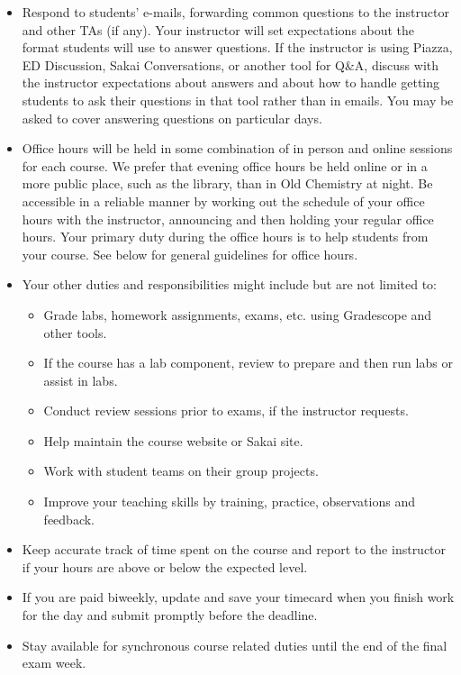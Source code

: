 \documentclass[
]{article}
\providecommand{\tightlist}{%
  \setlength{\itemsep}{0pt}\setlength{\parskip}{0pt}}
\begin{document}
\begin{itemize}
\item
  Respond to students' e-mails, forwarding common questions to the instructor and other TAs (if any). Your instructor will set expectations about the format students will use to answer questions. If the instructor is using Piazza, ED Discussion, Sakai Conversations, or another tool for Q\&A, discuss with the instructor expectations about answers and about how to handle getting students to ask their questions in that tool rather than in emails. You may be asked to cover answering questions on particular days.
\item
  Office hours will be held in some combination of in person and online sessions for each course. We prefer that evening office hours be held online or in a more public place, such as the library, than in Old Chemistry at night. Be accessible in a reliable manner by working out the schedule of your office hours with the instructor, announcing and then holding your regular office hours. Your primary duty during the office hours is to help students from your course. See below for general guidelines for office hours.
\item
  Your other duties and responsibilities might include but are not limited to:

  \begin{itemize}
  \tightlist
  \item
    Grade labs, homework assignments, exams, etc. using Gradescope and other tools.
  \item
    If the course has a lab component, review to prepare and then run labs or assist in labs.
  \item
    Conduct review sessions prior to exams, if the instructor requests.
  \item
    Help maintain the course website or Sakai site.
  \item
    Work with student teams on their group projects.
  \item
    Improve your teaching skills by training, practice, observations and feedback.
  \end{itemize}
\item
  Keep accurate track of time spent on the course and report to the instructor if your hours are above or below the expected level.
\item
  If you are paid biweekly, update and save your timecard when you finish work for the day and submit promptly before the deadline.
\item
  Stay available for synchronous course related duties until the end of the final exam week.


\end{itemize}
\end{document}
